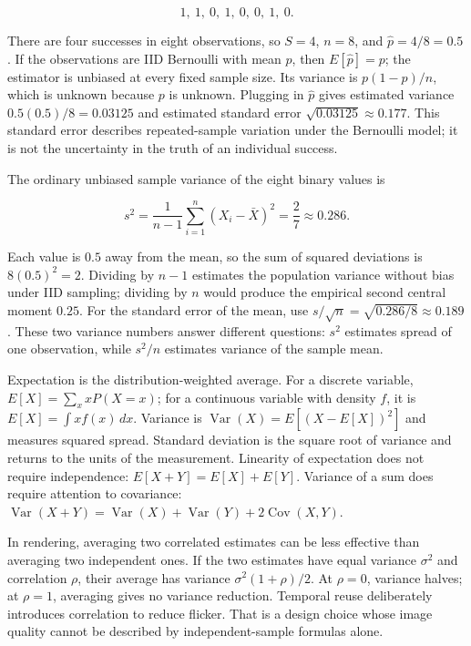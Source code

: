 \[
1,\ 1,\ 0,\ 1,\ 0,\ 0,\ 1,\ 0.
\]

There are four successes in eight observations, so \(S=4\), \(n=8\), and \(\hat p=4/8=0.5\). If the observations are IID Bernoulli with mean \(p\), then \(E[\hat p]=p\); the estimator is unbiased at every fixed sample size. Its variance is \(p(1-p)/n\), which is unknown because \(p\) is unknown. Plugging in \(\hat p\) gives estimated variance \(0.5(0.5)/8=0.03125\) and estimated standard error \(\sqrt{0.03125}\approx0.177\). This standard error describes repeated-sample variation under the Bernoulli model; it is not the uncertainty in the truth of an individual success.

The ordinary unbiased sample variance of the eight binary values is

\[
s^2=\frac{1}{n-1}\sum_{i=1}^{n}(X_i-\bar X)^2
=\frac{2}{7}\approx0.286.
\]

Each value is \(0.5\) away from the mean, so the sum of squared deviations is \(8(0.5)^2=2\). Dividing by \(n-1\) estimates the population variance without bias under IID sampling; dividing by \(n\) would produce the empirical second central moment \(0.25\). For the standard error of the mean, use \(s/\sqrt n=\sqrt{0.286/8}\approx0.189\). These two variance numbers answer different questions: \(s^2\) estimates spread of one observation, while \(s^2/n\) estimates variance of the sample mean.

Expectation is the distribution-weighted average. For a discrete variable, \(E[X]=\sum_x xP(X=x)\); for a continuous variable with density \(f\), it is \(E[X]=\int xf(x)\,dx\). Variance is \(\operatorname{Var}(X)=E[(X-E[X])^2]\) and measures squared spread. Standard deviation is the square root of variance and returns to the units of the measurement. Linearity of expectation does not require independence: \(E[X+Y]=E[X]+E[Y]\). Variance of a sum does require attention to covariance: \(\operatorname{Var}(X+Y)=\operatorname{Var}(X)+\operatorname{Var}(Y)+2\operatorname{Cov}(X,Y)\).

In rendering, averaging two correlated estimates can be less effective than averaging two independent ones. If the two estimates have equal variance \(\sigma^2\) and correlation \(\rho\), their average has variance \(\sigma^2(1+\rho)/2\). At \(\rho=0\), variance halves; at \(\rho=1\), averaging gives no variance reduction. Temporal reuse deliberately introduces correlation to reduce flicker. That is a design choice whose image quality cannot be described by independent-sample formulas alone.

